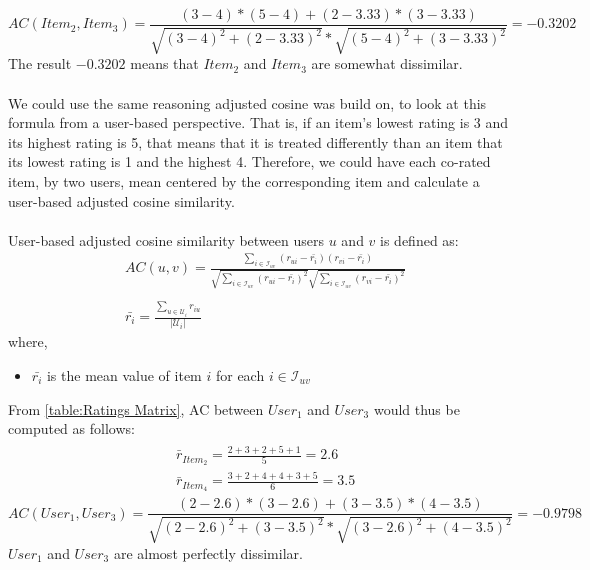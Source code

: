 $$AC(Item_2,Item_3) = \frac{(3 - 4)*(5 - 4) + (2 - 3.33)*(3 - 3.33)}
						 {\sqrt{(3 - 4)^2 + (2 - 3.33)^2}*
						  \sqrt{(5 - 4)^2 + (3 - 3.33)^2}} = −0.3202$$
The result $-0.3202$ means that $Item_2$ and $Item_3$ are somewhat dissimilar.\\\\
We could use the same reasoning adjusted cosine was build on,
to look at this formula from a user-based perspective. That is, if an item's
lowest rating is 3 and its highest rating is 5, that means that it is treated
differently than an item that its lowest rating is 1 and the highest 4.
Therefore, we could have each co-rated item, by two users, mean centered by the corresponding item
and calculate a user-based adjusted cosine similarity.\\\\
User-based adjusted cosine similarity between users $u$ and $v$ is defined as:
\begin{equation}
\begin{split}
    &AC(u,v) = \frac{\sum_{i \in \mathcal{I}_{uv}}(r_{ui}-\bar{r_{i}})(r_{vi}-\bar{r_{i}})}
		    {\sqrt{\sum_{i \in \mathcal{I}_{uv}}(r_{ui}-\bar{r_{i}})^2}
                     \sqrt{\sum_{i \in \mathcal{I}_{uv}}(r_{vi}-\bar{r_{i}})^2}} \\\\
    &\bar{r_{i}} = \frac{\sum_{u \in \mathcal{U}_i}r_{iu}}
 		        {\mathopen|\mathcal{U}_i\mathclose|}
\end{split}
\end{equation}
where,
\begin{itemize}
	\item[] $\bar{r_i}$ is the mean value of item $i$ for each $i \in \mathcal{I}_{uv}$
\end{itemize}
From \autoref{table:Ratings Matrix}, AC
between $User_1$ and $User_3$ would thus be computed as follows:
\begin{align*}
	\begin{split}
		&\bar{r}_{Item_2} = \frac{2 + 3 + 2 + 5 + 1}{5} = 2.6\\
		&\bar{r}_{Item_4} = \frac{3 + 2 + 4 + 4 + 3 + 5}{6} = 3.5
	\end{split}
\end{align*}
$$AC(User_1,User_3) = \frac{(2 - 2.6)*(3 - 2.6) + (3 - 3.5)*(4 - 3.5)}
						 {\sqrt{(2 - 2.6)^2 + (3 - 3.5)^2}*
						  \sqrt{(3 - 2.6)^2 + (4 - 3.5)^2}} = −0.9798$$
$User_1$ and $User_3$ are almost perfectly dissimilar.
